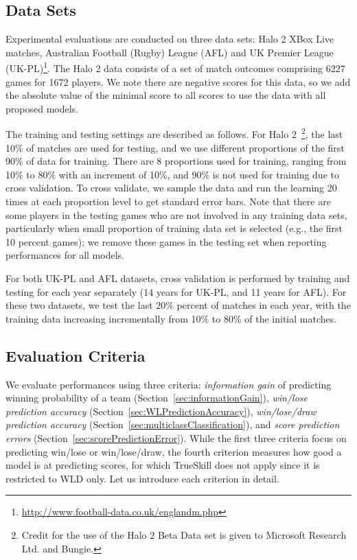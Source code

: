 \subsection{Data Sets}
\label{sec:data_sets}

Experimental evaluations are conducted on three data sets: Halo 2 XBox Live
matches, Australian Football
(Rugby) League (AFL)%
and UK
Premier League (UK-PL)\footnote{\noindent \url{http://www.football-data.co.uk/englandm.php}}.  The Halo 2 data consists of a
set of match outcomes comprising 6227 games for 1672 players. We note there are negative scores for this data, so we add the absolute value of the minimal score to all scores to use the data with all proposed models.

The training and testing settings are described as follows.  For Halo
2~\footnote{\noindent Credit for the use of the Halo 2 Beta Data set
is given to Microsoft Research Ltd. and Bungie.}, the last 10\%
of matches are used for testing, and we use different proportions of
the first 90\% of data for training. There are 8 proportions used
for training, ranging from 10\% to 80\% with an increment of
10\%, and 90\% is not used for training due to cross validation. To cross validate, we sample the data and run the learning 20 times at each proportion level
to get standard error bars. Note that there are some players in the
testing games who are not involved in any training data sets,
particularly when small proportion of training data set is selected
(e.g., the first 10 percent games); we remove these games in the
testing set when reporting performances for all models.

For both UK-PL and AFL datasets, cross validation is performed by
training and testing for each year separately (14 years for UK-PL, and
11 years for AFL).  For these two datasets, we test the last 20\%
percent of matches in each year, with the training data increasing
incrementally from 10\% to 80\% of the initial matches.

\subsection{Evaluation Criteria}

We evaluate performances using three criteria: {\it information gain}
of predicting winning probability of a team
(Section~\ref{sec:informationGain}),
{\it win/lose prediction accuracy}
(Section~\ref{sec:WLPredictionAccuracy}), {\it win/lose/draw prediction accuracy} (Section~\ref{sec:multiclassClassification}), 
and {\it score prediction errors}
(Section~\ref{sec:scorePredictionError}).
While the first three criteria focus on predicting win/lose or win/lose/draw, the fourth
criterion measures how good a model is at predicting scores, for which
TrueSkill does not apply since it is restricted to WLD only. Let us
introduce each criterion in detail.

